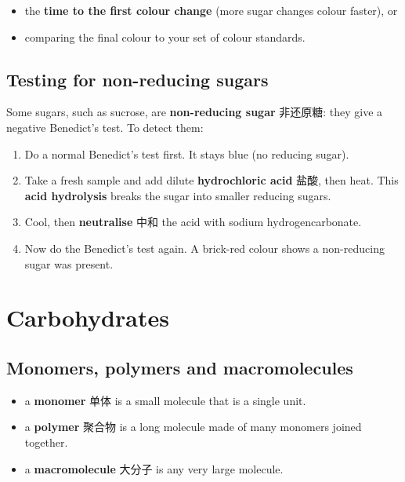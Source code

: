 \documentclass[11pt]{article}
\begin{document}
\begin{itemize}
\item the \textbf{time to the first colour change} (more sugar changes colour faster), or

\item comparing the final colour to your set of colour standards.

\end{itemize}

\subsection*{Testing for non-reducing sugars}

Some sugars, such as sucrose, are \textbf{non-reducing sugar} 非还原糖: they give a negative Benedict's test. To detect them:

\begin{enumerate}
\item Do a normal Benedict's test first. It stays blue (no reducing sugar).

\item Take a fresh sample and add dilute \textbf{hydrochloric acid} 盐酸, then heat. This \textbf{acid hydrolysis} breaks the sugar into smaller reducing sugars.

\item Cool, then \textbf{neutralise} 中和 the acid with sodium hydrogencarbonate.

\item Now do the Benedict's test again. A brick-red colour shows a non-reducing sugar was present.

\end{enumerate}

\section*{Carbohydrates}

\subsection*{Monomers, polymers and macromolecules}

\begin{itemize}
\item a \textbf{monomer} 单体 is a small molecule that is a single unit.

\item a \textbf{polymer} 聚合物 is a long molecule made of many monomers joined together.

\item a \textbf{macromolecule} 大分子 is any very large molecule.

\end{itemize}
\end{document}
